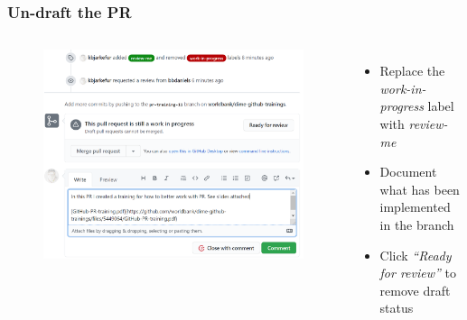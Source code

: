 \documentclass[aspectratio=169]{beamer} %
\begin{document}
\begin{frame}
	\frametitle{Un-draft the PR}
	\begin{columns}[c]

	\vspace{-.75cm}
	\begin{figure}
		\centering
		\includegraphics[width=\textwidth]{./img/undraft-pr.png}
	\end{figure}

	\begin{itemize}
		\setlength\itemsep{1em}
		\item Replace the \textit{work-in-progress} label
		with \textit{review-me}
		\item Document what has been implemented in the branch
		\item Click \textit{``Ready for review''} to remove draft status
	\end{itemize}

\end{columns}
\end{frame}
\end{document}
